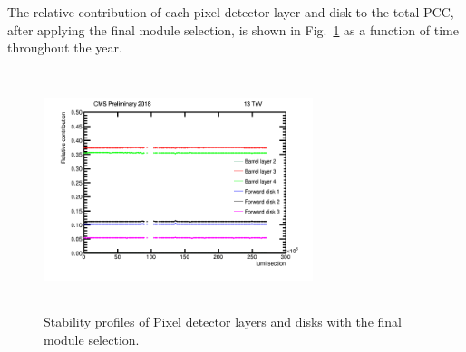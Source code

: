 The relative contribution of each pixel detector layer and disk to the total PCC, after applying the final module selection, is shown in Fig.~\ref{fig:stabprof} as a function of time throughout the year.
\begin{figure}[h]
    \centering
    \includegraphics[width=0.7\textwidth, height=7cm]{Chapter4/module_selection/ProfileX_combined_testing_LUM_20-001.png}
    \caption[Stability Profiles of Pixel Layers and Disks After Final Module Selection]{Stability profiles of Pixel detector layers and disks with the final module selection.}
    \label{fig:stabprof}
\end{figure}

